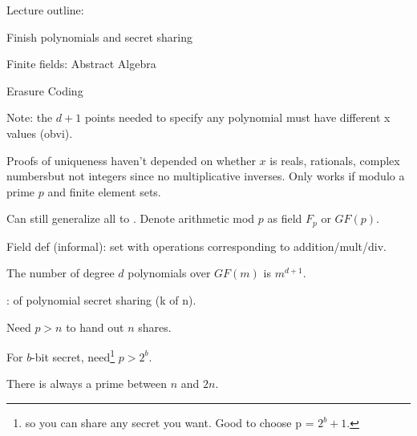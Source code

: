 \documentclass[12pt]{article}
\newcommand{\myspace}{\vspace{2\bigskipamount}}
\newcommand\p{\Needspace{12\baselineskip} \noindent}
\begin{document}


\p Lecture outline:
	\begin{compactitem}
		\item Finish polynomials and secret sharing
		\item Finite fields: Abstract Algebra
		\item Erasure Coding
	\end{compactitem}
Note: the $d+1$ points needed to specify any polynomial must have different x values (obvi). 

\myspace
\p {}
\begin{compactitem}
	\item Proofs of uniqueness haven't depended on whether $x$ is reals, rationals, complex numbers\textellipsis but not integers since no multiplicative inverses. Only works if modulo a prime $p$ and finite element sets. 
	\item Can still generalize all to . Denote arithmetic mod $p$ as field $F_p$ or $GF(p)$. 
	\item Field def (informal): set with operations corresponding to addition/mult/div. 
	\item {} The number of degree $d$ polynomials over $GF(m)$ is $m^{d+1}$. 
\end{compactitem}

\myspace
\p {}: of polynomial secret sharing (k of n). 
\begin{compactitem}
	\item Need $p>n$ to hand out $n$ shares.
	\item For $b$-bit secret, need\footnote{so you can share any secret you want. Good to choose p = $2^b + 1$.} $p > 2^b$. 
	\item \Theorem There is always a prime between $n$ and $2n$. 
\end{compactitem}
\end{document}
